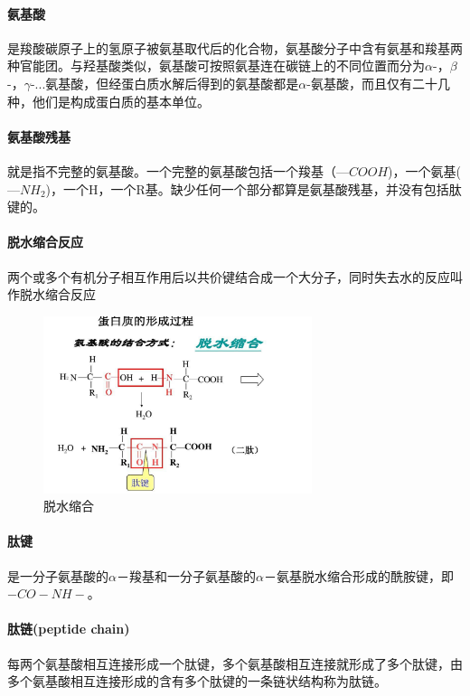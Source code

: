 \documentclass[12pt,a4paper]{article}
\begin{document}
\paragraph{氨基酸} 是羧酸碳原子上的氢原子被氨基取代后的化合物，氨基酸分子中含有氨基和羧基两种官能团。与羟基酸类似，氨基酸可按照氨基连在碳链上的不同位置而分为$\alpha$-，$\beta$-，$\gamma$-...氨基酸，但经蛋白质水解后得到的氨基酸都是$\alpha$-氨基酸，而且仅有二十几种，他们是构成蛋白质的基本单位。
\paragraph{氨基酸残基} 就是指不完整的氨基酸。一个完整的氨基酸包括一个羧基（$—COOH$)，一个氨基($—NH_2$)，一个H，一个R基。缺少任何一个部分都算是氨基酸残基，并没有包括肽键的。

\paragraph{脱水缩合反应} 两个或多个有机分子相互作用后以共价键结合成一个大分子，同时失去水的反应叫作脱水缩合反应
\begin{figure}[H]
	\centering
	\includegraphics[width=0.7\textwidth]{../images/dehydration-condensation.png}
	\caption{脱水缩合}
	\label{}
\end{figure}

\paragraph{肽键} 是一分子氨基酸的$\alpha$－羧基和一分子氨基酸的$\alpha$－氨基脱水缩合形成的酰胺键，即$-CO-NH-$。

\paragraph{肽链(peptide chain)} 每两个氨基酸相互连接形成一个肽键，多个氨基酸相互连接就形成了多个肽键，由多个氨基酸相互连接形成的含有多个肽键的一条链状结构称为肽链。
\end{document}
